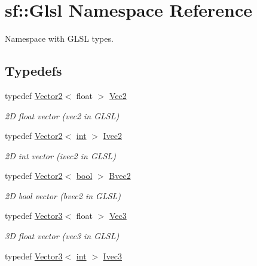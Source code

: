 \hypertarget{namespacesf_1_1_glsl}{\section{sf\-:\-:Glsl Namespace Reference}
\label{namespacesf_1_1_glsl}
}


Namespace with G\-L\-S\-L types.  


\subsection*{Typedefs}
\begin{DoxyCompactItemize}
\item 
typedef \hyperlink{classsf_1_1_vector2}{Vector2}$<$ float $>$ \hyperlink{namespacesf_1_1_glsl_adeed356d346d87634b4c197a530e4edf}{Vec2}
\begin{DoxyCompactList}\small\item\em 2\-D float vector ({\ttfamily vec2} in G\-L\-S\-L) \end{DoxyCompactList}\item 
typedef \hyperlink{classsf_1_1_vector2}{Vector2}$<$ \hyperlink{term__entry_8h_ad65b480f8c8270356b45a9890f6499ae}{int} $>$ \hyperlink{namespacesf_1_1_glsl_aab803ee70c4b7bfcd63ec09e10408fd3}{Ivec2}
\begin{DoxyCompactList}\small\item\em 2\-D int vector ({\ttfamily ivec2} in G\-L\-S\-L) \end{DoxyCompactList}\item 
typedef \hyperlink{classsf_1_1_vector2}{Vector2}$<$ \hyperlink{term__entry_8h_a002004ba5d663f149f6c38064926abac}{bool} $>$ \hyperlink{namespacesf_1_1_glsl_a59d8cf909c3d71ebf3db057480b464da}{Bvec2}
\begin{DoxyCompactList}\small\item\em 2\-D bool vector ({\ttfamily bvec2} in G\-L\-S\-L) \end{DoxyCompactList}\item 
typedef \hyperlink{classsf_1_1_vector3}{Vector3}$<$ float $>$ \hyperlink{namespacesf_1_1_glsl_a9bdd0463b7cb5316244a082007bd50f0}{Vec3}
\begin{DoxyCompactList}\small\item\em 3\-D float vector ({\ttfamily vec3} in G\-L\-S\-L) \end{DoxyCompactList}\item 
typedef \hyperlink{classsf_1_1_vector3}{Vector3}$<$ \hyperlink{term__entry_8h_ad65b480f8c8270356b45a9890f6499ae}{int} $>$ \hyperlink{namespacesf_1_1_glsl_a64f403dd0219e7f128ffddca641394df}{Ivec3}

\end{DoxyCompactItemize}
